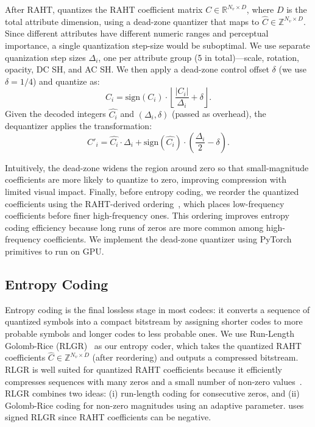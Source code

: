 After RAHT, \gsnfs quantizes the RAHT coefficient matrix $C\in\mathbb{R}^{N_v\times D}$, where $D$ is the total attribute dimension, using a dead-zone quantizer that maps to $\hat{C}\in\mathbb{Z}^{N_v\times D}$.
%
Since different attributes have different numeric ranges and perceptual importance, a single quantization step-size would be suboptimal.
%
We use separate quanization step sizes $\Delta_i$, one per attribute group (5 in total)---scale, rotation, opacity, DC SH, and AC SH.
%
We then apply a dead-zone control offset $\delta$ (we use $\delta = 1/4$) and quantize as:
\[
\hat{C_i} = \mathrm{sign}(C_i)\cdot \left\lfloor \frac{|C_i|}{\Delta_i} + \delta \right\rfloor.
\]
%
Given the decoded integers $\hat{C_i}$ and $(\Delta_i,\delta)$ (passed as overhead), the dequantizer applies the transformation:
\[
C'_i = \hat{C_i}\cdot \Delta_i + \mathrm{sign}(\hat{C_i})\cdot\left(\frac{\Delta_i}{2}-\delta\right).
\]

Intuitively, the dead-zone widens the region around zero so that small-magnitude coefficients are more likely to quantize to zero, improving compression with limited visual impact.
%
Finally, before entropy coding, we reorder the quantized coefficients using the RAHT-derived ordering~\cite{raht}, which places low-frequency coefficients before finer high-frequency ones.
%
This ordering improves entropy coding efficiency because long runs of zeros are more common among high-frequency coefficients.
%
We implement the dead-zone quantizer using PyTorch primitives to run on GPU.

\subsection{Entropy Coding}\label{sec:entropy-coding}
Entropy coding is the final lossless stage in most codecs: it converts a sequence of quantized symbols into a compact bitstream by assigning shorter codes to more probable symbols and longer codes to less probable ones.
%
We use Run-Length Golomb-Rice (RLGR)~\cite{rlgr} as our entropy coder, which takes the quantized RAHT coefficients $\hat{C}\in\mathbb{Z}^{N_v\times D}$ (after reordering) and outputs a compressed bitstream.
%
RLGR is well suited for quantized RAHT coefficients because it efficiently compresses sequences with many zeros and a small number of non-zero values~\cite{raht,gpcc}.
%
RLGR combines two ideas:
(i) run-length coding for consecutive zeros, and
(ii) Golomb-Rice coding for non-zero magnitudes using an adaptive parameter.
%
\gsnfs uses signed RLGR since RAHT coefficients can be negative.

